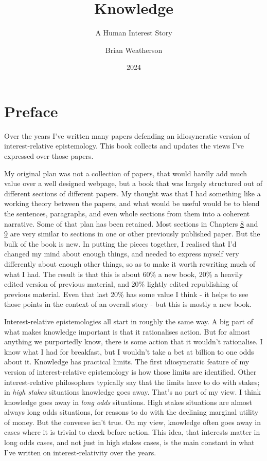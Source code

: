 \documentclass[
  10pt,
  letterpaper,
  twoside]{scrbook}
\title{Knowledge}
\subtitle{A Human Interest Story}
\author{Brian Weatherson}
\date{2024}
\renewcommand*\contentsname{Table of contents}
\newcommand\contentsname{Table of contents}
\begin{document}
\frontmatter
\maketitle

\renewcommand*\contentsname{Table of contents}
{
\setcounter{tocdepth}{2}
\tableofcontents
}

\mainmatter
{}

\chapter*{Preface}\label{sec-preface}


Over the years I've written many papers defending an idiosyncratic
version of interest-relative epistemology. This book collects and
updates the views I've expressed over those papers.

My original plan was not a collection of papers, that would hardly add
much value over a well designed webpage, but a book that was largely
structured out of different sections of different papers. My thought was
that I had something like a working theory between the papers, and what
would be useful would be to blend the sentences, paragraphs, and even
whole sections from them into a coherent narrative. Some of that plan
has been retained. Most sections in Chapters \hyperref[sec-ratbel]{8}
and \hyperref[sec-evidence]{9} are very similar to sections in one or
other previously published paper. But the bulk of the book is new. In
putting the pieces together, I realised that I'd changed my mind about
enough things, and needed to express myself very differently about
enough other things, so as to make it worth rewriting much of what I
had. The result is that this is about 60\% a new book, 20\% a heavily
edited version of previous material, and 20\% lightly edited
republishing of previous material. Even that last 20\% has some value I
think - it helps to see those points in the context of an overall story
- but this is mostly a new book.

Interest-relative epistemologies all start in roughly the same way. A
big part of what makes knowledge important is that it rationalises
action. But for almost anything we purportedly know, there is some
action that it wouldn't rationalise. I know what I had for breakfast,
but I wouldn't take a bet at billion to one odds about it. Knowledge has
practical limits. The first idiosyncratic feature of my version of
interest-relative epistemology is how those limits are identified. Other
interest-relative philosophers typically say that the limits have to do
with stakes; in \emph{high stakes} situations knowledge goes away.
That's no part of my view. I think knowledge goes away in \emph{long
odds} situations. High stakes situations are almost always long odds
situations, for reasons to do with the declining marginal utility of
money. But the converse isn't true. On my view, knowledge often goes
away in cases where it is trivial to check before action. This idea,
that interests matter in long odds cases, and not just in high stakes
cases, is the main constant in what I've written on interest-relativity
over the years.
\end{document}
